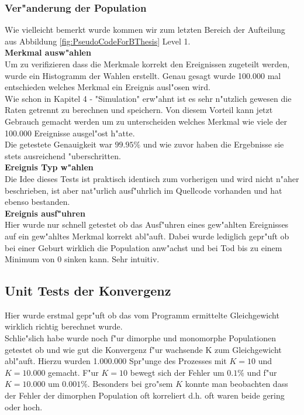 \documentclass[11pt, a4paper, german]{article}
\theoremstyle{plain}
\begin{document}
	\subsubsection{Ver"anderung der Population}
	Wie vielleicht bemerkt wurde kommen wir zum letzten Bereich der Aufteilung aus Abbildung \ref{fig:PseudoCodeForBThesis} Level 1.\\
	
	\textbf{Merkmal ausw"ahlen}\\
	Um zu verifizieren dass die Merkmale korrekt den Ereignissen zugeteilt werden, wurde ein Histogramm der Wahlen erstellt. Genau gesagt wurde 100.000 mal entschieden welches Merkmal ein Ereignis ausl"osen wird.\\
	Wie schon in Kapitel 4 - "{}Simulation"{} erw"ahnt ist es sehr n"utzlich gewesen die Raten getrennt zu berechnen und speichern. Von diesem Vorteil kann jetzt Gebrauch gemacht werden um zu unterscheiden welches Merkmal wie viele der 100.000 Ereignisse ausgel"ost h"atte.\\
	Die getestete Genauigkeit war $ 99.95\% $ und wie zuvor haben die Ergebnisse sie stets ausreichend "uberschritten.\\
	
	\textbf{Ereignis Typ w"ahlen}\\
	Die Idee dieses Tests ist praktisch identisch zum vorherigen und wird nicht n"aher beschrieben, ist aber nat"urlich ausf"uhrlich im Quellcode vorhanden und hat ebenso bestanden.\\
	
	\textbf{Ereignis ausf"uhren}\\
	Hier wurde nur schnell getestet ob das Ausf"uhren eines gew"ahlten Ereignisses auf ein gew"ahltes Merkmal korrekt abl"auft. Dabei wurde lediglich gepr"uft ob bei einer Geburt wirklich die Population anw"achst und bei Tod bis zu einem Minimum von 0 sinken kann. Sehr intuitiv.
	
	\subsection{Unit Tests der Konvergenz}
	Hier wurde erstmal gepr"uft ob das vom Programm ermittelte Gleichgewicht wirklich richtig berechnet wurde.\\
	Schlie"slich habe wurde noch f"ur dimorphe und monomorphe Populationen getestet ob und wie gut die Konvergenz f"ur wachsende K zum Gleichgewicht abl"auft. Hierzu wurden 1.000.000 Spr"unge des Prozesses mit $ K = 10 $ und $ K = 10.000 $ gemacht. F"ur $ K = 10 $ bewegt sich der Fehler um $ 0.1\% $ und f"ur $ K = 10.000 $ um $ 0.001\% $. Besonders bei gro"sem $ K $ konnte man beobachten dass der Fehler der dimorphen Population oft korreliert d.h. oft waren beide gering oder hoch.
	
\end{document}
